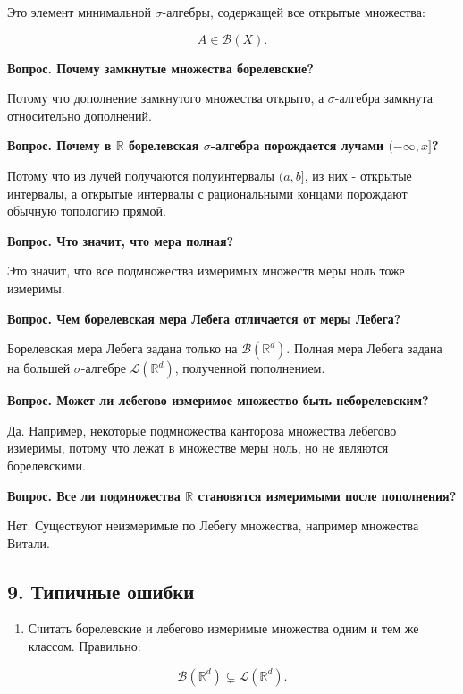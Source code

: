 \documentclass[
  11pt,
  a4paper,
]{article}
\providecommand{\tightlist}{%
  \setlength{\itemsep}{0pt}\setlength{\parskip}{0pt}}
\begin{document}
Это элемент минимальной \(\sigma\)-алгебры, содержащей все открытые
множества:

\[
A\in\mathcal B(X).
\]

\textbf{Вопрос. Почему замкнутые множества борелевские?}

Потому что дополнение замкнутого множества открыто, а \(\sigma\)-алгебра
замкнута относительно дополнений.

\textbf{Вопрос. Почему в \(\mathbb R\) борелевская \(\sigma\)-алгебра
порождается лучами \((-\infty,x]\)?}

Потому что из лучей получаются полуинтервалы \((a,b]\), из них -
открытые интервалы, а открытые интервалы с рациональными концами
порождают обычную топологию прямой.

\textbf{Вопрос. Что значит, что мера полная?}

Это значит, что все подмножества измеримых множеств меры ноль тоже
измеримы.

\textbf{Вопрос. Чем борелевская мера Лебега отличается от меры Лебега?}

Борелевская мера Лебега задана только на \(\mathcal B(\mathbb R^d)\).
Полная мера Лебега задана на большей \(\sigma\)-алгебре
\(\mathcal L(\mathbb R^d)\), полученной пополнением.

\textbf{Вопрос. Может ли лебегово измеримое множество быть
неборелевским?}

Да. Например, некоторые подмножества канторова множества лебегово
измеримы, потому что лежат в множестве меры ноль, но не являются
борелевскими.

\textbf{Вопрос. Все ли подмножества \(\mathbb R\) становятся измеримыми
после пополнения?}

Нет. Существуют неизмеримые по Лебегу множества, например множества
Витали.

\subsection{9. Типичные
ошибки}\label{ux442ux438ux43fux438ux447ux43dux44bux435-ux43eux448ux438ux431ux43aux438}

\begin{enumerate}
\def\labelenumi{\arabic{enumi}.}
\tightlist
\item
  Считать борелевские и лебегово измеримые множества одним и тем же
  классом. Правильно:
\end{enumerate}

\[
\mathcal B(\mathbb R^d)\subsetneq\mathcal L(\mathbb R^d).
\]
\end{document}
